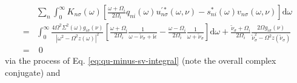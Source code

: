 \begin{equation}
\begin{split}
&\sum_n\int_0^\infty K_{n\sigma}(\omega)\left[\frac{\omega + \Omega_i}{2\Omega_i}q_{ni}(\omega)u^{\prime*}_{n\sigma}(\omega,\nu) - s_{ni}^*(\omega)v_{n\sigma}(\omega,\nu)\right]\mathrm{d}\omega\\
= &\int_0^\infty\frac{4\Omega^2\Sigma^2(\omega)g_{i\sigma}(\nu)}{|\omega^2 - \Omega^2z(\omega)|^2}\left[\frac{\omega + \Omega_i}{2\Omega_i}\frac{1}{\omega - \tilde{\nu}_\sigma + \mathrm{i}\epsilon} - \frac{\omega - \Omega_i}{2\Omega_i}\frac{1}{\omega + \tilde{\nu}_\sigma}\right]\mathrm{d}\omega + \frac{\tilde{\nu}_\sigma + \Omega_i}{2\Omega_i}\frac{2\Omega g_{i\sigma}(\nu)}{\tilde{\nu}_\sigma^2 - \Omega^2z(\tilde{\nu}_\sigma)}\\
= &\;0
\end{split}
\end{equation}
via the process of Eq. \eqref{eq:qu-minus-sv-integral} (note the overall complex conjugate) and
